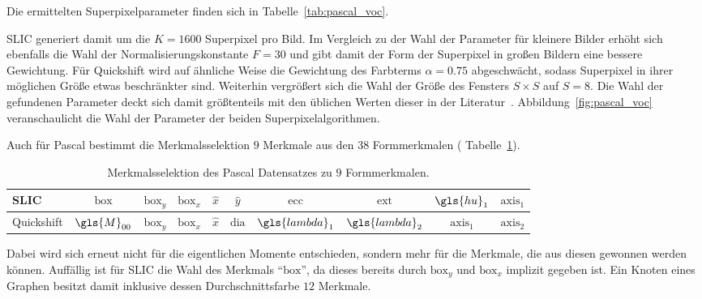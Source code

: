 Die ermittelten Superpixelparameter finden sich in Tabelle~\ref{tab:pascal_voc}.
\begin{table}[t]
\centering
{}
\caption[\gls{Pascal} Superpixelparameter]{Wahl der Superpixelparameter des \gls{Pascal} Datensatzes.}
\label{tab:pascal_voc}
\end{table}
\gls{SLIC} generiert damit um die $K=1600$ Superpixel pro Bild.
Im Vergleich zu der Wahl der Parameter für kleinere Bilder erhöht sich ebenfalls die Wahl der Normalisierungskonstante $F=30$ und gibt damit der Form der Superpixel in großen Bildern eine bessere Gewichtung.
Für Quickshift wird auf ähnliche Weise die Gewichtung des Farbterms $\alpha = 0.75$ abgeschwächt, sodass Superpixel in ihrer möglichen Größe etwas beschränkter sind.
Weiterhin vergrößert sich die Wahl der Größe des Fensters $S \times S$ auf $S = 8$.
Die Wahl der gefundenen Parameter deckt sich damit größtenteils mit den üblichen Werten dieser in der Literatur~\cite{Fulkerson}.
Abbildung~\ref{fig:pascal_voc} veranschaulicht die Wahl der Parameter der beiden Superpixelalgorithmen.


Auch für \gls{Pascal} bestimmt die Merkmalsselektion $9$ Merkmale aus den $38$ Formmerkmalen (\vgl{} Tabelle~\ref{tab:pascal_voc_merkmale}).
\begin{table}[t]
\centering
\begin{tabular}{lccccccccc}
  \toprule
  \gls{SLIC} & $\mathrm{box}$ & $\mathrm{box}_y$ & $\mathrm{box}_x$ & $\hat x$ & $\hat y$ & $\mathrm{ecc}$ & $\mathrm{ext}$ & $\gls{hu}_1$ & $\mathrm{axis}_1$\\
  \midrule{}
  Quickshift & $\gls{M}_{00}$ & $\mathrm{box}_y$ & $\mathrm{box}_x$ & $\hat x$ & $\mathrm{dia}$ & $\gls{lambda}_1$ & $\gls{lambda}_2$ & $\mathrm{axis}_1$ & $\mathrm{axis}_2$\\
  \bottomrule
\end{tabular}
  \caption[\gls{Pascal} Merkmalsselektion]{Merkmalsselektion des \gls{Pascal} Datensatzes zu $9$ Formmerkmalen.}
\label{tab:pascal_voc_merkmale}
\end{table}
Dabei wird sich erneut nicht für die eigentlichen Momente entschieden, sondern mehr für die Merkmale, die aus diesen gewonnen werden können.
Auffällig ist für \gls{SLIC} die Wahl des Merkmals \enquote{$\mathrm{box}$}, da dieses bereits durch $\mathrm{box}_y$ und $\mathrm{box}_x$ implizit gegeben ist.
Ein Knoten eines Graphen besitzt damit inklusive dessen Durchschnittsfarbe $12$ Merkmale.

